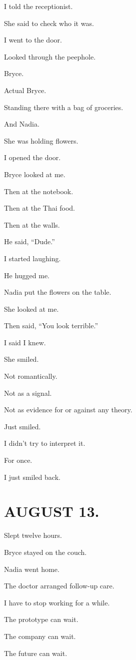 \documentclass[11pt,oneside]{book}
\begin{document}
I told the receptionist.

She said to check who it was.

I went to the door.

Looked through the peephole.

Bryce.

Actual Bryce.

Standing there with a bag of groceries.

And Nadia.

She was holding flowers.

I opened the door.

Bryce looked at me.

Then at the notebook.

Then at the Thai food.

Then at the walls.

He said, ``Dude.''

I started laughing.

He hugged me.

Nadia put the flowers on the table.

She looked at me.

Then said, ``You look terrible.''

I said I knew.

She smiled.

Not romantically.

Not as a signal.

Not as evidence for or against any theory.

Just smiled.

I didn't try to interpret it.

For once.

I just smiled back.

\section*{AUGUST 13.}

Slept twelve hours.

Bryce stayed on the couch.

Nadia went home.

The doctor arranged follow-up care.

I have to stop working for a while.

The prototype can wait.

The company can wait.

The future can wait.
\end{document}
